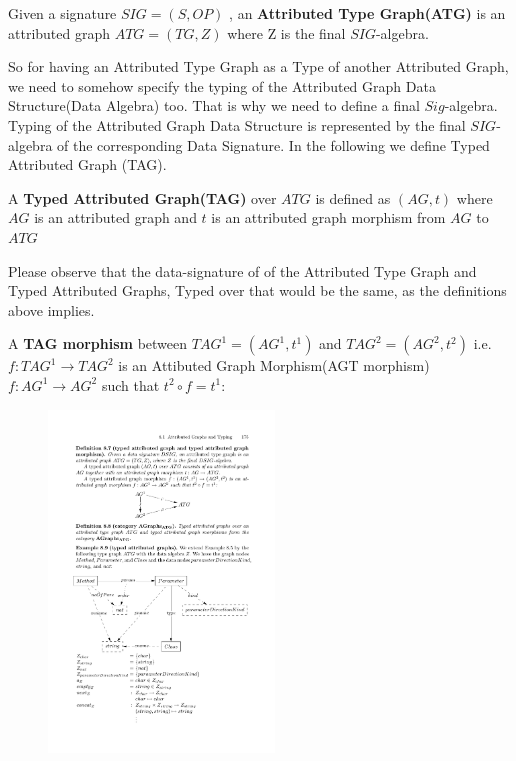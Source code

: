 \begin{ProposalDef}
Given a signature $SIG = (S, OP)$ , an \textbf{Attributed Type Graph(ATG)} is an attributed graph $ATG=(TG,Z)$ where Z is the final $SIG$-algebra. 
\end{ProposalDef}

So for having an Attributed Type Graph as a Type of another Attributed Graph, we need to somehow specify the typing of the 
Attributed Graph Data Structure(Data Algebra) too. That is why we need to define a final $Sig$-algebra. Typing of the Attributed Graph Data Structure is represented by the final $SIG$-algebra of the corresponding Data Signature. In the following we define Typed Attributed Graph (TAG).

\begin{ProposalDef}
\label{Def:TAG}
A \textbf{Typed Attributed Graph(TAG)} over $ATG$ is defined as $(AG, t)$  where $AG$ is an attributed graph and $t$ is an  attributed graph morphism from $AG$ to $ATG$
\end{ProposalDef}


Please observe that the data-signature of of the Attributed Type Graph and Typed Attributed Graphs, Typed over that would be the same, as the definitions above implies.

\begin{ProposalDef}
A \textbf{TAG morphism} between $TAG^1=(AG^1,t^1)$ and  $TAG^2=(AG^2,t^2)$ i.e. $f: TAG^1 \rightarrow TAG^2$ is an Attibuted Graph Morphism(AGT morphism) $f: AG^1 \rightarrow AG^2$ such that $t^2 \circ f=t^1$:
\end{ProposalDef}

\begin{figure}[ht!]
\centering
\includegraphics[width=60mm]{images/TAG-morphism}
\label{AG morphism}
\end{figure}

